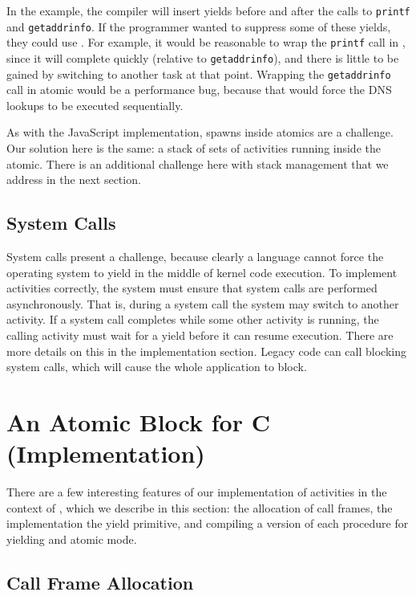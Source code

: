 \documentclass[acmsmall,anonymous,review]{acmart}\settopmatter{printfolios=true,printccs=false,printacmref=false}
\begin{document}
In the example, the compiler will insert yields before and after the calls to \texttt{printf} and \texttt{getaddrinfo}.
If the programmer wanted to suppress some of these yields, they could use \atomic{}.
For example, it would be reasonable to wrap the \texttt{printf} call in \atomic{}, since it will complete quickly (relative to \texttt{getaddrinfo}), and there is little to be gained by switching to another task at that point.
Wrapping the \texttt{getaddrinfo} call in atomic would be a performance bug, because that would force the DNS lookups to be executed sequentially.

As with the JavaScript implementation, spawns inside atomics are a challenge.
Our solution here is the same: a stack of sets of activities running inside the atomic.
There is an additional challenge here with stack management that we address in the next section.

\subsection{System Calls}

System calls present a challenge, because clearly a language cannot force the operating system to yield in the middle of kernel code execution.
To implement activities correctly, the system must ensure that system calls are performed asynchronously.
That is, during a system call the system may switch to another activity.
If a system call completes while some other activity is running, the calling activity must wait for a yield before it can resume execution.
There are more details on this in the implementation section.
Legacy code can call blocking system calls, which will cause the whole application to block.

\section{An Atomic Block for C (Implementation)}

There are a few interesting features of our implementation of activities in the context of \charcoal{}, which we describe in this section: the allocation of call frames, the implementation the yield primitive, and compiling a version of each procedure for yielding and atomic mode.

\subsection{Call Frame Allocation}
\end{document}
